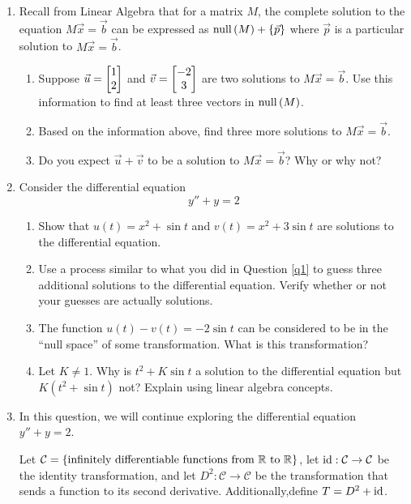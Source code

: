 \begin{enumerate}
	\item\label{q1}
	Recall from Linear Algebra that for a matrix $M$, the complete solution to the equation $M\vec x=\vec b$ can be expressed as
	$
		\mathrm{null}\,(M)+\{\vec p\}
	$
		where $\vec p$ is a particular solution to $M\vec x=\vec b$.
		
	\begin{enumerate}
		\item Suppose $\vec u=\begin{bmatrix}1\\2\end{bmatrix}$ and $\vec v=\begin{bmatrix}-2\\3\end{bmatrix}$ are two solutions to $M\vec x=\vec b$. Use this information
		to find at least three vectors in $\mathrm{null}\,(M)$.
		\item Based on the information above, find three more solutions to $M\vec x=\vec b$.
		\item Do you expect $\vec u+\vec v$ to be a solution to $M\vec x=\vec b$? Why or why not?
	\end{enumerate}

	\item Consider the differential equation
	\[
		y''+y=2
	\]
	\begin{enumerate}
		\item Show that $u(t)=x^2+\sin t$ and $v(t)=x^2+3\sin t$ are solutions to the differential equation.
		\item Use a process similar to what you did in Question \ref{q1} to guess three additional solutions to the differential equation. Verify
		whether or not your guesses are actually solutions.
		\item The function $u(t)-v(t)=-2\sin t$ can be considered to be in the ``null space'' of some transformation. What is this transformation?
		\item Let $K\neq 1$. Why is $t^2+K\sin t$ a solution to the differential equation but $K(t^2+\sin t)$ not? Explain using linear algebra concepts.
	\end{enumerate}

	\item In this question, we will continue exploring the differential equation $y''+y=2$.
	
	Let $\mathcal C=\{\text{infinitely differentiable functions from $\mathbb{R}$ to $\mathbb{R}$}\}$, let $\operatorname{id}:\mathcal C\to\mathcal C$
	be the identity transformation, and let $D^2:\mathcal C\to\mathcal C$ be the transformation that sends a function to its second derivative.
	Additionally,define $T=D^2+\operatorname{id}$.


\end{enumerate}
